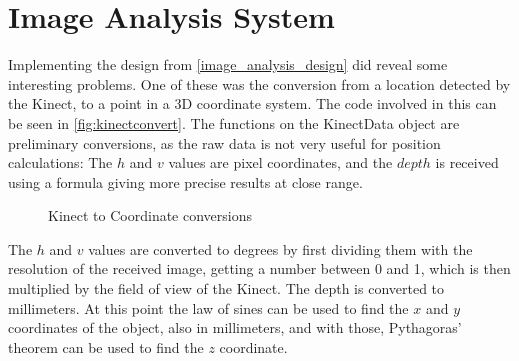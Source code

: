\section{Image Analysis System}

Implementing the design from \autoref{image_analysis_design} did reveal some interesting problems. One of these
was the conversion from a location detected by the Kinect, to a point in a 3D coordinate system. The code involved
in this can be seen in \autoref{fig:kinectconvert}. The functions on the KinectData object are preliminary conversions,
as the raw data is not very useful for position calculations: The $h$ and $v$ values are pixel coordinates, and the $depth$
is received using a formula giving more precise results at close range.

\begin{figure}[hbtp]

\caption{Kinect to Coordinate conversions}
\label{fig:kinectconvert} 
\end{figure}

The $h$ and $v$ values are converted to degrees by first dividing them with the resolution of the received image, getting
a number between 0 and 1, which is then multiplied by the field of view of the Kinect. The depth is converted to
millimeters. At this point the law of sines can be used to find the $x$ and $y$ coordinates of the object, also in
millimeters, and with those, Pythagoras' theorem can be used to find the $z$ coordinate.



